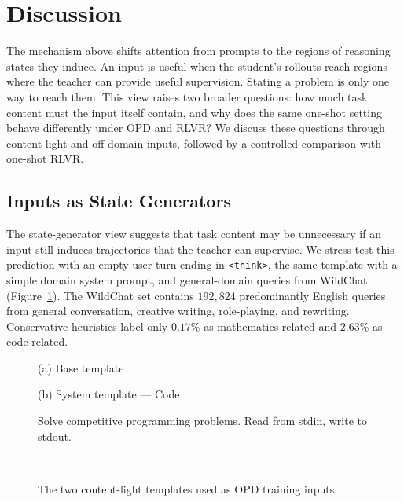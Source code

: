 
\section{Discussion}
\label{sec:discussion}

The mechanism above shifts attention from prompts to the regions of reasoning states they induce. An input is useful when the student's rollouts reach regions where the teacher can provide useful supervision. Stating a problem is only one way to reach them. This view raises two broader questions: how much task content must the input itself contain, and why does the same one-shot setting behave differently under OPD and RLVR? We discuss these questions through content-light and off-domain inputs, followed by a controlled comparison with one-shot RLVR.

\subsection{Inputs as State Generators}
\label{sec:template}

The state-generator view suggests that task content may be unnecessary if an input still induces trajectories that the teacher can supervise. We stress-test this prediction with an empty user turn ending in \texttt{<think>}, the same template with a simple domain system prompt, and general-domain queries from WildChat~\citep{zhao2024wildchat} (Figure~\ref{fig:template-examples}). The WildChat set contains \(192{,}824\) predominantly English queries from general conversation, creative writing, role-playing, and rewriting. Conservative heuristics label only \(0.17\%\) as mathematics-related and \(2.63\%\) as code-related.

\begin{figure}[t]
\centering
\begin{minipage}[t]{0.485\textwidth}
\begin{tplbox}{(a) Base template}
\begin{tplinput}
\ttfamily\scriptsize\raggedright {}
\end{tplinput}
\end{tplbox}
\end{minipage}\hfill
\begin{minipage}[t]{0.485\textwidth}
\begin{tplbox}{(b) System template --- Code}
\begin{tplinput}
\ttfamily\scriptsize\raggedright {}Solve competitive programming problems. Read from stdin, write to stdout.
\end{tplinput}
\end{tplbox}
\end{minipage}
\\[4pt]
\caption{The two content-light templates used as OPD training inputs.}
\label{fig:template-examples}
\end{figure}

